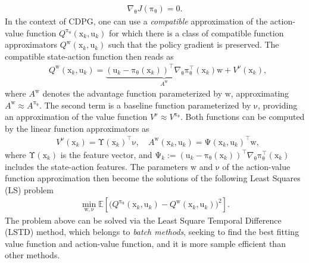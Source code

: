 \documentclass[10pt,twocolumn,twoside]{IEEEtran}
\newcommand{\vect}[1]{\ensuremath{\boldsymbol{\mathrm{#1}}}}
\begin{document}
\begin{align}\label{eq:necessary_condition}
    \nabla_{\vect\theta} J\left(\vect\pi_{\vect\theta}\right)=0.
\end{align}
In the context of CDPG, one can use a \textit{compatible} approximation of the action-value function $Q^{\vect\pi _{\vect\theta}} (\vect x_k,\vect u_k)$ for which there is a class of compatible function approximators $Q^{\vect w}(\vect x_k,\vect u_k)$ such that the policy gradient is preserved. The compatible state-action function then reads as
\begin{align}
\label{eq:Q_w}
&Q^{\vect w}(\vect x_k,\vect u_k)=\underbrace{{{\left( {\vect u_k - {\vect\pi _{\vect\theta}\left(\vect x_k\right) }} \right)}^{\top}}\nabla_{\vect\theta}\vect\pi_{\vect\theta}^\top\left(\vect x_k\right){\vect w}}_{A^{\vect w}} + { V^{\vect\nu}}\left( \vect x_k\right),
\end{align}
where $A^{\vect w}$ denotes the advantage function parameterized by $\vect w$, approximating $A^{\vect w}\approx A^{\vect\pi_{\vect\theta}}$. The second term is a baseline function parameterized by $\vect\nu$, providing an approximation of the value function $V^{\vect\nu}\approx V^{\vect\pi_{\vect\theta}}$. Both functions can be computed by the linear function approximators as
\begin{align}
       &{V^{\vect\nu}} \left(\vect x_k\right ) =\vect\Upsilon\left(\vect x_k \right)^\top {\vect \nu},\quad {A^{\vect w}} \left(\vect x_k,\vect u_k\right ) =\vect \Psi\left(\vect x_k,\vect u_k \right)^\top {\vect w}\label{eq:adv},
\end{align}
where $\vect\Upsilon\left(\vect x_k\right)$ is the feature vector, and $\vect \Psi_k:={{\left( {\vect u_k - {\vect\pi_{\vect\theta}\left(\vect x_k\right) }} \right)}^{\top}}\nabla_{\vect\theta}\vect\pi_{\vect\theta}^\top\left(\vect x_k\right)$ includes the state-action features. The parameters $\vect w$ and $\vect\nu$ of the action-value function approximation then become the solutions of the following Least Squares (LS) problem
\begin{align}
\label{eq:error}
    \min_{\vect w, \vect\nu} \mathbb{E} \left[\big( Q^{\vect\pi_{\vect\theta}}(\vect x_k,\vect u_k)-Q^{\vect w} (\vect x_k,\vect u_k)\big )^2\right].
\end{align}
The problem above can be solved via the Least Square Temporal Difference (LSTD) method, which belongs to \textit{batch methods}, seeking to find the best fitting value function and action-value function, and it is more sample efficient than other methods.
\end{document}
